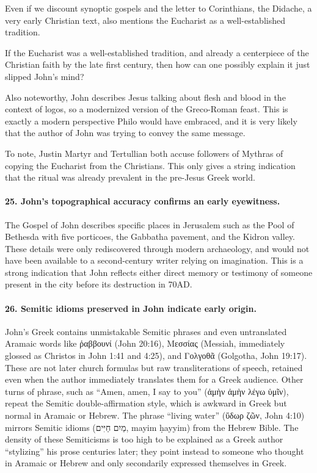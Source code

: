 Even if we discount synoptic gospels and the letter to Corinthians, the Didache, a very early Christian text, also mentions the Eucharist as a well-established tradition.

If the Eucharist was a well-established tradition, and already a centerpiece of the Christian faith by the late first century, then how can one possibly explain it just slipped John's mind?

Also noteworthy, John describes Jesus talking about flesh and blood in the context of logos, so a modernized version of the Greco-Roman feast.
This is exactly a modern perspective Philo would have embraced, and it is very likely that the author of John was trying to convey the same message.

To note, Justin Martyr and Tertullian both accuse followers of Mythras of copying the Eucharist from the Christians.
This only gives a string indication that the ritual was already prevalent in the pre-Jesus Greek world.

\paragraph{25.
John’s topographical accuracy confirms an early eyewitness.}\label{par:johns-topographical-accuracy-confirms-an-early-eyewitness.}

The Gospel of John describes specific places in Jerusalem such as the Pool of Bethesda with five porticoes, the Gabbatha pavement, and the Kidron valley.
These details were only rediscovered through modern archaeology, and would not have been available to a second-century writer relying on imagination.
This is a strong indication that John reflects either direct memory or testimony of someone present in the city before its destruction in 70AD.

\paragraph{26.
Semitic idioms preserved in John indicate early origin.}\label{par:semitic-idioms-preserved-in-john-indicate-early-origin.}

John’s Greek contains unmistakable Semitic phrases and even untranslated Aramaic words like ῥαββουνί (John 20:16), Μεσσίας (Messiah, immediately glossed as Christos in John 1:41 and 4:25), and Γολγοθᾶ (Golgotha, John 19:17).
These are not later church formulas but raw transliterations of speech, retained even when the author immediately translates them for a Greek audience.
Other turns of phrase, such as “Amen, amen, I say to you” (ἀμὴν ἀμὴν λέγω ὑμῖν), repeat the Semitic double-affirmation style, which is awkward in Greek but normal in Aramaic or Hebrew.
The phrase “living water” (ὕδωρ ζῶν, John 4:10) mirrors Semitic idioms (מַיִם חַיִּים, mayim ḥayyim) from the Hebrew Bible.
The density of these Semiticisms is too high to be explained as a Greek author “stylizing” his prose centuries later; they point instead to someone who thought in Aramaic or Hebrew and only secondarily expressed themselves in Greek.

